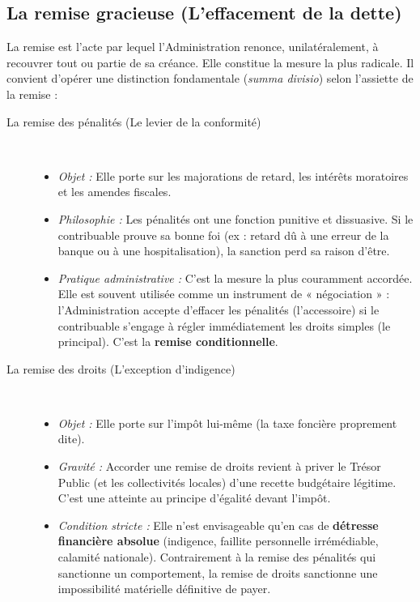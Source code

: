 \documentclass[Cours_contentieuxTF2026.tex]{subfiles}
\begin{document}
\subsection{La remise gracieuse (L'effacement de la dette)}

La remise est l'acte par lequel l'Administration renonce, unilatéralement, à recouvrer tout ou partie de sa créance. Elle constitue la mesure la plus radicale. Il convient d'opérer une distinction fondamentale (\textit{summa divisio}) selon l'assiette de la remise :

\begin{description}
	\item[La remise des pénalités (Le levier de la conformité)] \hfill \\
	\begin{itemize}
		\item \textit{Objet :} Elle porte sur les majorations de retard, les intérêts moratoires et les amendes fiscales.
		\item \textit{Philosophie :} Les pénalités ont une fonction punitive et dissuasive. Si le contribuable prouve sa bonne foi (ex : retard dû à une erreur de la banque ou à une hospitalisation), la sanction perd sa raison d'être.
		\item \textit{Pratique administrative :} C'est la mesure la plus couramment accordée. Elle est souvent utilisée comme un instrument de « négociation » : l'Administration accepte d'effacer les pénalités (l'accessoire) si le contribuable s'engage à régler immédiatement les droits simples (le principal). C'est la \textbf{remise conditionnelle}.
	\end{itemize}
	
	\item[La remise des droits (L'exception d'indigence)] \hfill \\
	\begin{itemize}
		\item \textit{Objet :} Elle porte sur l'impôt lui-même (la taxe foncière proprement dite).
		\item \textit{Gravité :} Accorder une remise de droits revient à priver le Trésor Public (et les collectivités locales) d'une recette budgétaire légitime. C'est une atteinte au principe d'égalité devant l'impôt.
		\item \textit{Condition stricte :} Elle n'est envisageable qu'en cas de \textbf{détresse financière absolue} (indigence, faillite personnelle irrémédiable, calamité nationale). Contrairement à la remise des pénalités qui sanctionne un comportement, la remise de droits sanctionne une impossibilité matérielle définitive de payer.
	\end{itemize}
\end{description}
\end{document}
